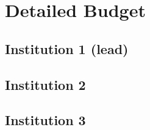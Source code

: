 \documentclass[oneside,12pt]{article}
\begin{document}
    \clearpage

    \section*{Detailed Budget}

    \subsection*{Institution 1 (lead)}

    \subsection*{Institution 2}

    \subsection*{Institution 3}
\end{document}

